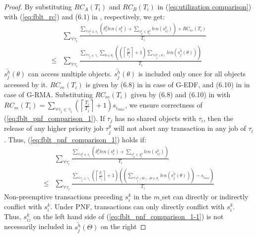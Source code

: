 \documentclass[conference]{IEEEtran}
\begin{document}
\begin{proof}
By substituting $RC_{A}(T_{i})$ and $RC_{B}(T_{i})$ in (\ref{eq:utilization comparison})
with (\ref{eq:fblt_rc}) and (6.1) in \cite{shambake_phd_proposal}, 
respectively, we get:
\begin{eqnarray}
 & \sum_{\forall\tau_{i}}\frac{\sum_{\forall s_{i}^{k}\in s_{i}}\left(\delta_{i}^{k}len(s_{i}^{k})+\sum_{s_{iz}^{k}\in\chi_{i}^{k}}len(s_{iz}^{k})\right)+RC_{re}(T_{i})}{T_{i}}\nonumber\\
\le & \sum_{\forall\tau_{i}}\frac{\sum_{\forall\tau_{j}\in\gamma_{i}}\sum_{\theta\in\theta_{i}}\left(\left(\left\lceil \frac{T_{i}}{T_{j}}\right\rceil +1\right)\sum_{\forall\bar{s_{j}^{h}}(\theta)}len\left(\bar{s_{j}^{h}}(\theta)\right)\right)}{T_{i}}\label{eq:fblt_pnf_comparison_1} 
\end{eqnarray}
%
$\bar{s_{j}^{h}}(\theta)$ can access multiple objects. $\bar{s_{j}^{h}}(\theta)$
is included only once for all objects accessed by it. $RC_{re}(T_{i})$
is given by (6.8) in \cite{shambake_phd_proposal} in case of G-EDF,
and (6.10) in \cite{shambake_phd_proposal} in case of G-RMA. Substituting $RC_{re}(T_{i})$ given by (6.8) and (6.10) in \cite{shambake_phd_proposal} with $RC_{re}(T_{i})=\sum_{\forall\tau_{j}\in\gamma_{i}}\left(\left\lceil \frac{T_{i}}{T_{j}}\right\rceil +1\right)s_{i_{max}}$, we ensure correctness of (\ref{eq:fblt_pnf_comparison_1}). If $\tau_{j}$ has no shared objects with $\tau_{i}$, then the release of
any higher priority job $\tau_{j}^{y}$ will not abort any transaction
in any job of $\tau_{i}$. Thus, (\ref{eq:fblt_pnf_comparison_1}) holds
if:
\begin{eqnarray}
 & \sum_{\forall\tau_{i}}\frac{\sum_{\forall s_{i}^{k}\in s_{i}}\left(\delta_{i}^{k}len(s_{i}^{k})+\sum_{s_{iz}^{k}\in\chi_{i}^{k}}len(s_{iz}^{k})\right)}{T_{i}}\label{eq:fblt_pnf_comparison_1-1}\\
\le & \sum_{\forall\tau_{i}}\frac{\sum_{\forall\tau_{j}\in\gamma_{i}}\left(\left\lceil \frac{T_{i}}{T_{j}}\right\rceil +1\right)\left(\left(\sum_{\forall\bar{s_{j}^{h}}(\Theta),\,\Theta\in\theta_{i}}len\left(\bar{s_{j}^{h}}(\theta)\right)\right)-s_{i_{max}}\right)}{T_{i}}\nonumber
\end{eqnarray}
%
Non-preemptive transactions preceding $s_{i}^{k}$ in the $m\_$set can directly or indirectly  conflict with $s_{i}^{k}$. Under PNF, transactions can only directly conflict with $s_{i}^{k}$. Thus, $s_{iz}^{k}$ on the left hand side of (\ref{eq:fblt_pnf_comparison_1-1}) is
not necessarily included in $\bar{s_{j}^{h}}(\Theta)$ on the right

\end{proof}
\end{document}
